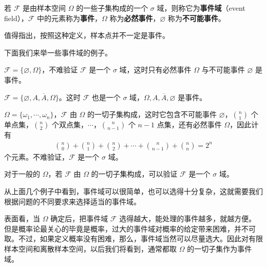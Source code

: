 \documentclass[../../main.tex]{subfiles}
\begin{document}
\begin{definition}[事件域]\label{definition:ch01-事件域}
若 $\mathscr{F}$ 是由样本空间 $\Omega$ 的一些子集构成的一个 $\sigma$ 域，则称它为\textbf{事件域}（event field），$\mathscr{F}$ 中的元素称为\textbf{事件}，$\Omega$ 称为\textbf{必然事件}，$\varnothing$ 称为\textbf{不可能事件}。
\end{definition}

值得指出，按照这种定义，样本点并不一定是事件。

下面我们来举一些事件域的例子。

\begin{example}[平凡事件域]\label{example:ch01-平凡事件域}
$\mathscr{F}=\{\varnothing,\Omega\}$，不难验证 $\mathscr{F}$ 是一个 $\sigma$ 域，这时只有必然事件 $\Omega$ 与不可能事件 $\varnothing$ 是事件。
\end{example}

\begin{example}[二元事件域]\label{example:ch01-二元事件域}
$\mathscr{F}=\{\varnothing,A,\overline{A},\Omega\}$。这时 $\mathscr{F}$ 也是一个 $\sigma$ 域，$\Omega,A,\overline{A},\varnothing$ 是事件。
\end{example}

\begin{example}[有限集幂集]\label{example:ch01-有限集幂集}
$\Omega=\{\omega_1,\cdots,\omega_n\}$，$\mathscr{F}$ 由 $\Omega$ 的一切子集构成，这时它包含不可能事件 $\varnothing$，$\binom{n}{1}$ 个单点集，$\binom{n}{2}$ 个双点集，$\cdots$，$\binom{n}{n-1}$ 个 $n-1$ 点集，还有必然事件 $\Omega$，因此计有
\begin{align*}
\binom{n}{0}+\binom{n}{1}+\binom{n}{2}+\cdots+\binom{n}{n-1}+\binom{n}{n}=2^n
\end{align*}
个元素。不难验证，$\mathscr{F}$ 是一个 $\sigma$ 域。
\end{example}

\begin{example}[一般幂集]\label{example:ch01-一般幂集}
对于一般的 $\Omega$，若 $\mathscr{F}$ 由 $\Omega$ 的一切子集构成，可以验证 $\mathscr{F}$ 是一个 $\sigma$ 域。
\end{example}

从上面几个例子中看到，事件域可以很简单，也可以选得十分复杂，这就需要我们根据问题的不同要求来选择适当的事件域。

表面看，当 $\Omega$ 确定后，把事件域 $\mathscr{F}$ 选得越大，能处理的事件越多，就越方便。但是概率论最关心的毕竟是概率，过大的事件域对概率的给定带来困难，并不可取。不过，如果定义概率没有困难，那么，事件域当然可以尽量选大。因此对有限样本空间和离散样本空间，以后我们将看到，通常都取 $\Omega$ 的一切子集作为事件域。
\end{document}
